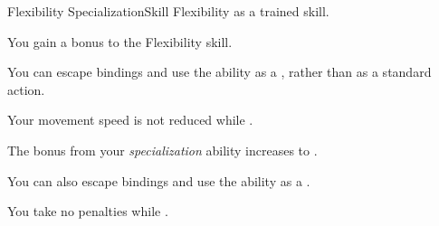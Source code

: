 
  \begin{feat}{Flexibility Specialization}{Skill}
    \featpre Flexibility as a trained skill.

     You gain a  bonus to the Flexibility skill.

     You can escape bindings and use the  ability as a , rather than as a standard action.

     Your movement speed is not reduced while \squeezing.

     The bonus from your \textit{specialization} ability increases to .

     You can also escape bindings and use the  ability as a .

     You take no penalties while \squeezing.
  \end{feat}

